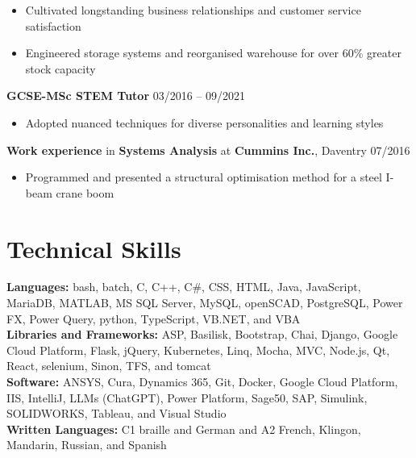 \documentclass[10pt,a4paper]{article}
\begin{document}
\begin{itemize}[noitemsep]
   \item Cultivated longstanding business relationships and customer service satisfaction
   \item Engineered storage systems and reorganised warehouse for over 60\% greater stock capacity
\end{itemize}
\textbf{GCSE-MSc STEM Tutor} \hfill 03/2016 -- 09/2021\vspace{-\baselineskip}\medskip
\begin{itemize}[noitemsep]
   \item Adopted nuanced techniques for diverse personalities and learning styles
\end{itemize}
\textbf{Work experience} in \textbf{Systems Analysis} at \textbf{Cummins Inc.}, Daventry \hfill 07/2016\vspace{-\baselineskip}\medskip
\begin{itemize}[noitemsep]
   \item Programmed and presented a structural optimisation method for a steel I-beam crane boom
\end{itemize}

\section*{Technical Skills}\vspace{-\baselineskip}\medskip
\textbf{Languages:} bash, batch, C, C++, C\#, CSS, HTML, Java, JavaScript, MariaDB, MATLAB, MS SQL Server, MySQL, openSCAD, PostgreSQL, Power FX, Power Query, python, TypeScript, VB.NET, and VBA\smallskip\\
\textbf{Libraries and Frameworks:} ASP, Basilisk, Bootstrap, Chai, Django, Google Cloud Platform, Flask, jQuery, Kubernetes, Linq, Mocha, MVC, Node.js, Qt, React, selenium, Sinon, TFS, and tomcat\smallskip\\
\textbf{Software:} ANSYS, Cura, Dynamics 365, Git, Docker, Google Cloud Platform, IIS, IntelliJ, LLMs (ChatGPT), Power Platform, Sage50, SAP, Simulink, SOLIDWORKS, Tableau, and Visual Studio\smallskip\\
\textbf{Written Languages:} C1 braille and German and A2 French, Klingon, Mandarin, Russian, and Spanish
\end{document}
